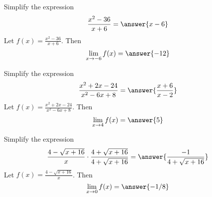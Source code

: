 \documentclass{ximera}
\begin{document}
\begin{problem}\label{prob:240hom2prob5}
Simplify the expression
$$\frac{x^2-36}{x+6}=\answer{x-6}$$
Let $f(x)=\frac{x^2-36}{x+6}$.  Then 
$$\lim_{x\to -6}f(x)=\answer{-12}$$
\end{problem}

\begin{problem}\label{prob:240hom2prob6}
Simplify the expression
$$\frac{x^2+2x-24}{x^2-6x+8}=\answer{\frac{x+6}{x-2}}$$
Let $f(x)=\frac{x^2+2x-24}{x^2-6x+8}$.  Then 
$$\lim_{x\to 4}f(x)=\answer{5}$$
\end{problem}

\begin{problem}\label{prob:240hom2prob7}
Simplify the expression
$$\frac{4-\sqrt{x+16}}{x}\cdot\frac{4+\sqrt{x+16}}{4+\sqrt{x+16}}=\answer{\frac{-1}{4+\sqrt{x+16}}}$$
Let $f(x)=\frac{4-\sqrt{x+16}}{x}$.  Then 
$$\lim_{x\to 0}f(x)=\answer{-1/8}$$
\end{problem}
\end{document}
